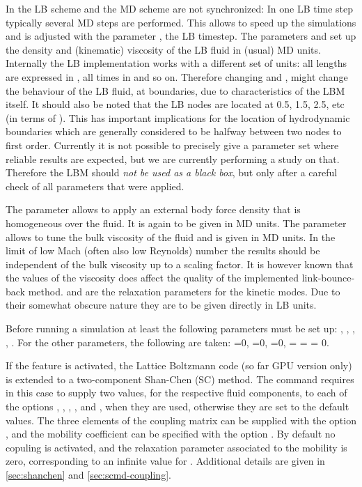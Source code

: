 In \es the LB scheme and the MD scheme are not synchronized: In one LB
time step typically several MD steps are performed. This allows to
speed up the simulations and is adjusted with the parameter ,
the LB timestep.
The parameters  and  set up the density and
(kinematic) viscosity of the LB fluid in (usual) MD units.  Internally the LB
implementation works with a different set of units: all lengths are
expressed in , all times in  and so on.  Therefore
changing  and , might change the behaviour of the
LB fluid, \eg at boundaries, due to characteristics of the LBM
itself. It should also be noted that the LB nodes are located at 0.5, 1.5, 2.5, etc (in terms of ).
This has important implications for the location of hydrodynamic boundaries which are generally considered
to be halfway between two nodes to first order.
Currently it is not possible to precisely give a parameter set
where reliable results are expected, but we are currently performing a
study on that. Therefore the LBM should \emph{not be used as a black
  box}, but only after a careful check of all parameters that were
applied. 

The parameter  allows to apply an external body force
density that is homogeneous over the fluid. It is again to be given in
MD units.  The parameter  allows to tune the bulk
viscosity of the fluid and is given in MD units. In the limit of low
Mach (often also low Reynolds) number the results should be
independent of the bulk viscosity up to a scaling factor. 
It is however known that the values of the viscosity does 
affect the quality of the implemented link-bounce-back method.
 and
 are the relaxation parameters for the kinetic
modes. Due to their somewhat obscure nature they are to be given
directly in LB units.

Before running a simulation at least the following parameters must be
set up: , , , ,
. For the other parameters, the following are taken:
=0, =0, =0,
 =  =  = 0.

If the feature  is activated, the Lattice Boltzmann
code (so far GPU version only) is extended to a two-component
Shan-Chen (SC) method.  The  command requires in this case
to supply two values, for the respective fluid components, to each
of the options , , , ,
 and , when they are used, otherwise
they are set to the default values. The three elements of the
coupling matrix can be supplied with the option ,
and the mobility coefficient can be
specified with the option . By default no copuling is activated, and the relaxation parameter associated to the mobility is zero, corresponding to an infinite value for . Additional details are
given in \ref{sec:shanchen} and \ref{sec:scmd-coupling}.

